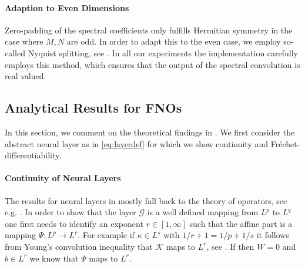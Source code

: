 \paragraph{Adaption to Even Dimensions}
%
%
Zero-padding of the spectral coefficients only fulfills Hermitian symmetry in the case where $M,N$ are odd. In order to adapt this to the even case, we employ so-called Nyquist splitting, see \cite{trigo19}. In all our experiments the implementation carefully employs this method, which ensures that the output of the spectral convolution is real valued.
%
%
\subsection{Analytical Results for FNOs}\label{sec:FNOAna}
%
%
In this section, we comment on the theoretical findings in \cite{kabri2023resolution}. We first consider the abstract neural layer as in \cref{eq:layerdef} for which we show continuity and Fréchet-differentiability.
%
%
\paragraph{Continuity of Neural Layers} The results for neural layers in \cite{kabri2023resolution} mostly fall back to the theory of \Nem{} operators, see e.g. \cite{tröltzsch, ambrosetti}. In order to show that the layer $\mathcal{G}$ is a well defined mapping from $L^p$ to $L^q$ one first needs to identify an exponent $r\in [1,\infty]$ such that the affine part is a mapping $\Psi:L^p\to L^r$. For example if $\kappa\in L^s$ with $1/r + 1 = 1/p + 1/s$ it follows from Young's convolution inequality that $\mathcal{K}$ maps to $L^r$, see \cite[Th. 1.2.12]{grafakos}. If then $W=0$ and $b\in L^r$ we know that $\Psi$ maps to $L^r$.

